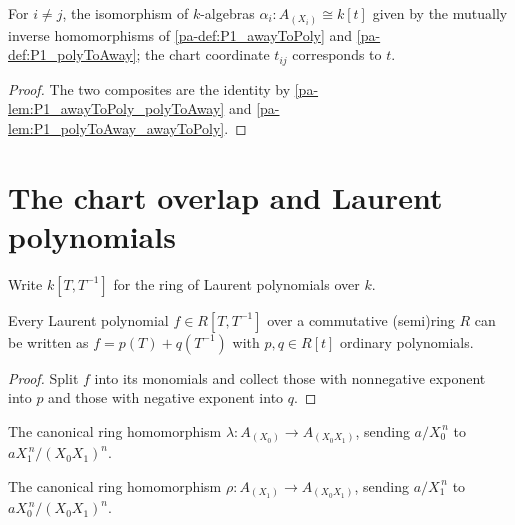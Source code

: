 \begin{definition}
  \label{pa-def:P1_awayAlgEquiv}
  \leanok

  For \(i \neq j\), the isomorphism of \(k\)-algebras
  \(\alpha_i : A_{(X_i)} \cong k[t]\) given by the mutually inverse homomorphisms of
  \ref{pa-def:P1_awayToPoly} and \ref{pa-def:P1_polyToAway}; the chart coordinate \(t_{ij}\)
  corresponds to \(t\).
\end{definition}
\begin{proof}
  \leanok
  The two composites are the identity by \ref{pa-lem:P1_awayToPoly_polyToAway} and
  \ref{pa-lem:P1_polyToAway_awayToPoly}.
\end{proof}

\section{The chart overlap and Laurent polynomials}

Write \(k[T, T^{-1}]\) for the ring of Laurent polynomials over \(k\).

\begin{lemma}
  \label{pa-lem:laurent_span}
  \leanok

  Every Laurent polynomial \(f \in R[T, T^{-1}]\) over a commutative (semi)ring \(R\) can be
  written as \(f = p(T) + q(T^{-1})\) with \(p, q \in R[t]\) ordinary polynomials.
\end{lemma}
\begin{proof}
  \leanok
  Split \(f\) into its monomials and collect those with nonnegative exponent into \(p\) and
  those with negative exponent into \(q\).
\end{proof}

\begin{definition}
  \label{pa-def:P1_awayToOverlapLeft}
  \leanok

  The canonical ring homomorphism \(\lambda : A_{(X_0)} \to A_{(X_0 X_1)}\), sending
  \(a / X_0^{\,n}\) to \(a X_1^{\,n} / (X_0 X_1)^{n}\).
\end{definition}

\begin{definition}
  \label{pa-def:P1_awayToOverlapRight}
  \leanok

  The canonical ring homomorphism \(\rho : A_{(X_1)} \to A_{(X_0 X_1)}\), sending
  \(a / X_1^{\,n}\) to \(a X_0^{\,n} / (X_0 X_1)^{n}\).
\end{definition}


